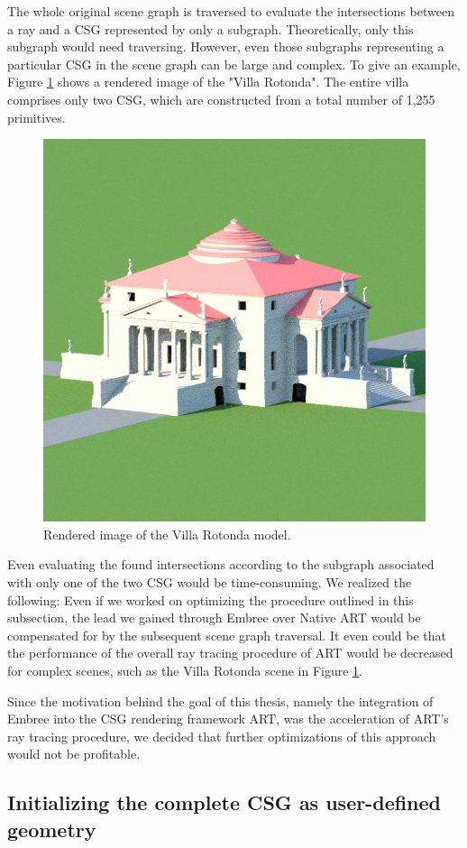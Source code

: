 The whole original scene graph is traversed to evaluate the intersections between a ray and a CSG represented by only a subgraph. Theoretically, only this subgraph would need traversing. However, even those subgraphs representing a particular CSG in the scene graph can be large and complex. To give an example, Figure \ref{fig:rotonda_intro} shows a rendered image of the "Villa Rotonda". The entire villa comprises only two CSG, which are constructed from a total number of 1,255 primitives.

\begin{figure}
	\centering
	\includegraphics[width=.5\linewidth]{img/3 approach/villaRotondaNormal.png}
	\caption{Rendered image of the Villa Rotonda model.}
	\label{fig:rotonda_intro}
\end{figure}

Even evaluating the found intersections according to the subgraph associated with only one of the two CSG would be time-consuming. We realized the following: Even if we worked on optimizing the procedure outlined in this subsection, the lead we gained through Embree over Native ART would be compensated for by the subsequent scene graph traversal. It even could be that the performance of the overall ray tracing procedure of ART would be decreased for complex scenes, such as the Villa Rotonda scene in Figure \ref{fig:rotonda_intro}.

Since the motivation behind the goal of this thesis, namely the integration of Embree into the CSG rendering framework ART, was the acceleration of ART's ray tracing procedure, we decided that further optimizations of this approach would not be profitable.


\subsection{Initializing the complete CSG as user-defined geometry}
\label{subsec:apprach2}


